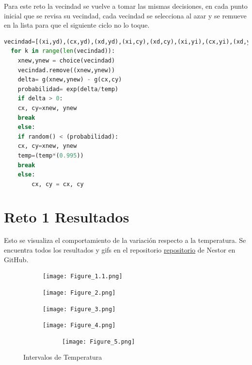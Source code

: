 \documentclass{article}
\begin{document}
Para este reto la vecindad se vuelve a tomar las mismas decisiones, en cada punto inicial que se revisa su vecindad, cada vecindad se selecciona al azar y se remueve en la lista para que el siguiente ciclo no lo toque.
\begin{lstlisting}[caption=Vecindad, language=Python]
vecindad=[(xi,yd),(cx,yd),(xd,yd),(xi,cy),(xd,cy),(xi,yi),(cx,yi),(xd,yi)]
  for k in range(len(vecindad)):
    xnew,ynew = choice(vecindad)
    vecindad.remove((xnew,ynew))
    delta= g(xnew,ynew) - g(cx,cy)
    probabilidad= exp(delta/temp)
    if delta > 0:
    cx, cy=xnew, ynew        
    break
    else:
    if random() < (probabilidad):
    cx, cy=xnew, ynew        
    temp=(temp*(0.995))
    break
    else:
        cx, cy = cx, cy
\end{lstlisting}

\section{Reto 1 Resultados}\label{}
Esto se visualiza el comportamiento de la variación respecto a la temperatura. Se encuentra todos los resultados y gifs en el repositorio \href{https://github.com/satuelisa/Simulation/blob/master/LocalSearch/minimize1D.py}{repositorio} de Nestor en GitHub.\\

\begin{figure}
     \centering
     \begin{subfigure}[b]{0.40\textwidth}
         \centering
         \texttt{[image: Figure\_1.1.png]}
         \caption{}
         \label{fig:notocan}
     \end{subfigure}
     \begin{subfigure}[b]{0.40\textwidth}
         \centering
         \texttt{[image: Figure\_2.png]}
         \caption{}
         \label{fig:tocan}
     \end{subfigure}
     \begin{subfigure}[b]{0.40\textwidth}
         \centering
         \texttt{[image: Figure\_3.png]}
         \caption{}
         \label{fig:tocan}
     \end{subfigure}
     \begin{subfigure}[b]{0.40\textwidth}
         \centering
         \texttt{[image: Figure\_4.png]}
         \caption{}
         \label{fig:tocan}
         \begin{subfigure}[b]{0.40\textwidth}
         \centering
         \texttt{[image: Figure\_5.png]}
         \caption{}
         \label{fig:tocan}
     \end{subfigure}
     \end{subfigure}
     \caption{Intervalos de Temperatura}
      \label{semilla}
\end{figure}
\end{document}
